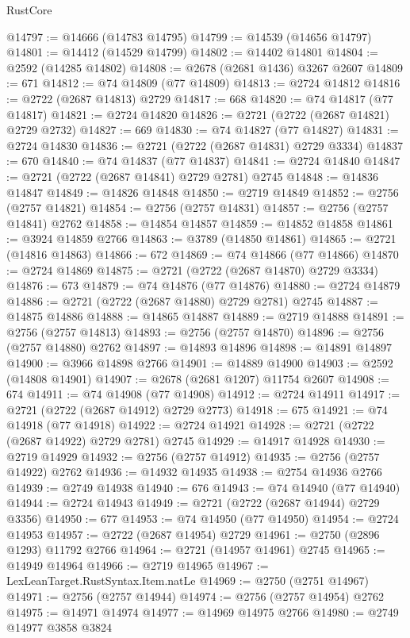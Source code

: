 \begin{lexlean}{RustCore}
\begin{coremodule}
@14797 := @14666 (@14783 @14795)
@14799 := @14539 (@14656 @14797)
@14801 := @14412 (@14529 @14799)
@14802 := @14402 @14801
@14804 := @2592 (@14285 @14802)
@14808 := @2678 (@2681 @1436) @3267 @2607
@14809 := 671
@14812 := @74 @14809 (@77 @14809)
@14813 := @2724 @14812
@14816 := @2722 (@2687 @14813) @2729
@14817 := 668
@14820 := @74 @14817 (@77 @14817)
@14821 := @2724 @14820
@14826 := @2721 (@2722 (@2687 @14821) @2729 @2732)
@14827 := 669
@14830 := @74 @14827 (@77 @14827)
@14831 := @2724 @14830
@14836 := @2721 (@2722 (@2687 @14831) @2729 @3334)
@14837 := 670
@14840 := @74 @14837 (@77 @14837)
@14841 := @2724 @14840
@14847 := @2721 (@2722 (@2687 @14841) @2729 @2781) @2745
@14848 := @14836 @14847
@14849 := @14826 @14848
@14850 := @2719 @14849
@14852 := @2756 (@2757 @14821)
@14854 := @2756 (@2757 @14831)
@14857 := @2756 (@2757 @14841) @2762
@14858 := @14854 @14857
@14859 := @14852 @14858
@14861 := @3924 @14859 @2766
@14863 := @3789 (@14850 @14861)
@14865 := @2721 (@14816 @14863)
@14866 := 672
@14869 := @74 @14866 (@77 @14866)
@14870 := @2724 @14869
@14875 := @2721 (@2722 (@2687 @14870) @2729 @3334)
@14876 := 673
@14879 := @74 @14876 (@77 @14876)
@14880 := @2724 @14879
@14886 := @2721 (@2722 (@2687 @14880) @2729 @2781) @2745
@14887 := @14875 @14886
@14888 := @14865 @14887
@14889 := @2719 @14888
@14891 := @2756 (@2757 @14813)
@14893 := @2756 (@2757 @14870)
@14896 := @2756 (@2757 @14880) @2762
@14897 := @14893 @14896
@14898 := @14891 @14897
@14900 := @3966 @14898 @2766
@14901 := @14889 @14900
@14903 := @2592 (@14808 @14901)
@14907 := @2678 (@2681 @1207) @11754 @2607
@14908 := 674
@14911 := @74 @14908 (@77 @14908)
@14912 := @2724 @14911
@14917 := @2721 (@2722 (@2687 @14912) @2729 @2773)
@14918 := 675
@14921 := @74 @14918 (@77 @14918)
@14922 := @2724 @14921
@14928 := @2721 (@2722 (@2687 @14922) @2729 @2781) @2745
@14929 := @14917 @14928
@14930 := @2719 @14929
@14932 := @2756 (@2757 @14912)
@14935 := @2756 (@2757 @14922) @2762
@14936 := @14932 @14935
@14938 := @2754 @14936 @2766
@14939 := @2749 @14938
@14940 := 676
@14943 := @74 @14940 (@77 @14940)
@14944 := @2724 @14943
@14949 := @2721 (@2722 (@2687 @14944) @2729 @3356)
@14950 := 677
@14953 := @74 @14950 (@77 @14950)
@14954 := @2724 @14953
@14957 := @2722 (@2687 @14954) @2729
@14961 := @2750 (@2896 @1293) @11792 @2766
@14964 := @2721 (@14957 @14961) @2745
@14965 := @14949 @14964
@14966 := @2719 @14965
@14967 := LexLeanTarget.RustSyntax.Item.natLe
@14969 := @2750 (@2751 @14967)
@14971 := @2756 (@2757 @14944)
@14974 := @2756 (@2757 @14954) @2762
@14975 := @14971 @14974
@14977 := @14969 @14975 @2766
@14980 := @2749 @14977 @3858 @3824

\end{coremodule}
\end{lexlean}
